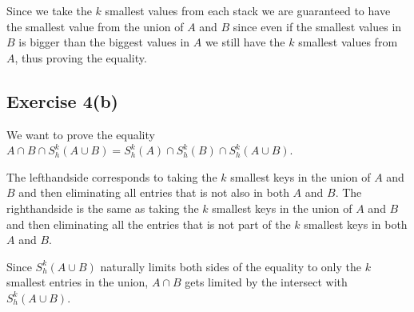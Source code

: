 Since we take the $k$ smallest values from each stack we are guaranteed to have
the smallest value from the union of $A$ and $B$ since even if the smallest
values in $B$ is bigger than the biggest values in $A$ we still have the $k$
smallest values from $A$, thus proving the equality.

\subsection{Exercise 4(b)}


We want to prove the equality $A \cap B \cap S^{k}_{h}(A \cup B) = S^{k}_{h}(A)
\cap S^{k}_{h}(B) \cap S^{k}_{h}(A \cup B)$.

The lefthandside corresponds to taking the $k$ smallest keys in the union of
$A$ and $B$ and then eliminating all entries that is not also in both $A$ and
$B$.
%
The righthandside is the same as taking the $k$ smallest keys in the union of
$A$ and $B$ and then eliminating all the entries that is not part of the $k$
smallest keys in both $A$ and $B$.

Since $S^{k}_{h}(A \cup B)$ naturally limits both sides of the equality to only
the $k$ smallest entries in the union, $A \cap B$ gets limited by the intersect
with $S^{k}_{h}(A \cup B)$.


